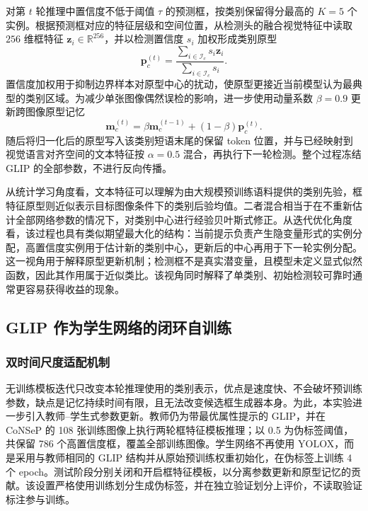 对第 $t$ 轮推理中置信度不低于阈值 $\tau$ 的预测框，按类别保留得分最高的 $K=5$ 个实例。根据预测框对应的特征层级和空间位置，从检测头的融合视觉特征中读取 $256$ 维框特征 $\boldsymbol z_i\in\mathbb{R}^{256}$，并以检测置信度 $s_i$ 加权形成类别原型
\begin{equation}
\boldsymbol p_c^{(t)}=
\frac{\sum_{i\in\mathcal I_c}s_i\boldsymbol z_i}
{\sum_{i\in\mathcal I_c}s_i}.
\end{equation}
置信度加权用于抑制边界样本对原型中心的扰动，使原型更接近当前模型认为最典型的类别区域。为减少单张图像偶然误检的影响，进一步使用动量系数 $\beta=0.9$ 更新跨图像原型记忆
\begin{equation}
\boldsymbol m_c^{(t)}
=\beta\boldsymbol m_c^{(t-1)}
 +(1-\beta)\boldsymbol p_c^{(t)}.
\end{equation}
随后将归一化后的原型写入该类别短语末尾的保留 token 位置，并与已经映射到视觉语言对齐空间的文本特征按 $\alpha=0.5$ 混合，再执行下一轮检测。整个过程冻结 GLIP 的全部参数，不进行反向传播。

从统计学习角度看，文本特征可以理解为由大规模预训练语料提供的类别先验，框特征原型则近似表示目标图像条件下的类别后验均值。二者混合相当于在不重新估计全部网络参数的情况下，对类别中心进行经验贝叶斯式修正。从迭代优化角度看，该过程也具有类似期望最大化的结构：当前提示负责产生隐变量形式的实例分配，高置信度实例用于估计新的类别中心，更新后的中心再用于下一轮实例分配。这一视角用于解释原型更新机制；检测框不是真实潜变量，且模型未定义显式似然函数，因此其作用属于近似类比。该视角同时解释了单类别、初始检测较可靠时通常更容易获得收益的现象。

\subsection{GLIP 作为学生网络的闭环自训练}

\subsubsection{双时间尺度适配机制}

无训练模板迭代只改变本轮推理使用的类别表示，优点是速度快、不会破坏预训练参数，缺点是记忆持续时间有限，且无法改变候选框生成器本身。为此，本实验进一步引入教师--学生式参数更新。教师仍为带最优属性提示的 GLIP，并在 CoNSeP 的 108 张训练图像上执行两轮框特征模板推理；以 0.5 为伪标签阈值，共保留 786 个高置信度框，覆盖全部训练图像。学生网络不再使用 YOLOX，而是采用与教师相同的 GLIP 结构并从原始预训练权重初始化，在伪标签上训练 4 个 epoch。测试阶段分别关闭和开启框特征模板，以分离参数更新和原型记忆的贡献。该设置严格使用训练划分生成伪标签，并在独立验证划分上评价，不读取验证标注参与训练。

